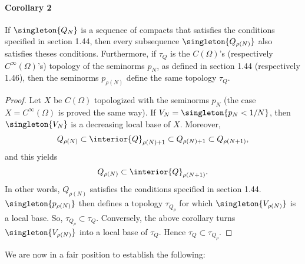 \paragraph{Corollary 2}
If 
%
  $\singleton{Q_N}$ 
%
is a sequence of compacts that satisfies the conditions specified 
in section 1.44, then every subsequence 
%
  $\singleton{Q_{\rho(N)}}$ 
%
also satisfies theses conditions.
%
Furthermore, if $\tau_{Q}$ is the $C(\Omega)$'s 
(respectively $C^\infty (\Omega)$'s) topology of the seminorms $p_{N}$, 
as defined in section 1.44 (respectively 1.46), then the seminorms 
%
  $p_{\rho(N)}$ 
%
define the same topology $\tau_{Q}$.
%
\begin{proof}%
%
Let $X$ be $C(\Omega)$ topologized with the seminorms $p_{N}$ 
(the case $X=C^\infty(\Omega)$ is proved the same way).
%
If 
    $V_{N} = \singleton{p_{N} < 1/N}$, 
then 
    $\singleton{V_{N}}$ 
is a decreasing local base of $X$.
%
Moreover,
% 
  \begin{align}
    Q_{\rho(N)} 
      \subset 
    \interior{Q}_{\rho(N) + 1} 
      \subset 
    Q_{\rho(N) + 1} 
      \subset 
    Q_{\rho(N+ 1)},
  \end{align}
% 
and this yields
%
  \begin{align}
    Q_{\rho(N)} 
      \subset 
    \interior{Q}_{\rho(N+ 1)}.
  \end{align}
%
In other words, 
%
  $Q_{\rho(N)}$ satisfies the conditions specified in section 1.44.
%
%
  $\singleton{p_{\rho(N)}}$
% 
then defines a topology $\tau_{Q_\rho}$ for which  
% 
  $\singleton{V_{\rho(N)}}$ 
%
is a local base. So, 
% 
  $\tau_{Q_\rho} \subset \tau_{Q}$.
%
Conversely, the above corollary turns 
%
  $\singleton{V_{\rho(N)}}$ 
%
into a local base of $\tau_{Q}$. Hence  
%
  $\tau_{Q}\subset \tau_{Q_\rho}$.
%
\end{proof}
\noindent We are now in a fair position to establish the following:
